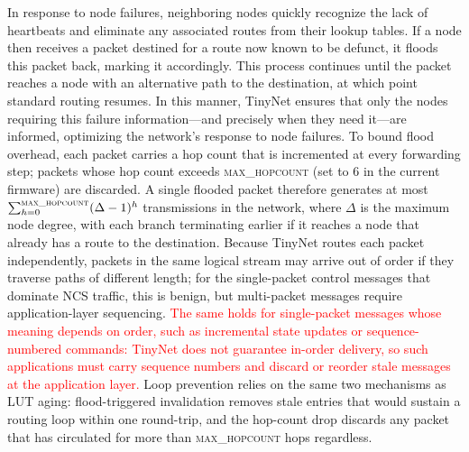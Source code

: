In response to node failures, neighboring nodes quickly recognize the lack of heartbeats and eliminate any associated routes from their lookup tables. If a node then receives a packet destined for a route now known to be defunct, it floods this packet back, marking it accordingly. This process continues until the packet reaches a node with an alternative path to the destination, at which point standard routing resumes. In this manner, TinyNet ensures that only the nodes requiring this failure information---and precisely when they need it---are informed, optimizing the network's response to node failures. To bound flood overhead, each packet carries a hop count that is incremented at every forwarding step; packets whose hop count exceeds \textsc{max\_hopcount} (set to 6 in the current firmware) are discarded. A single flooded packet therefore generates at most $\sum_{h=0}^{\textsc{max\_hopcount}}(\Delta-1)^{h}$ transmissions in the network, where $\Delta$ is the maximum node degree, with each branch terminating earlier if it reaches a node that already has a route to the destination. Because TinyNet routes each packet independently, packets in the same logical stream may arrive out of order if they traverse paths of different length; for the single-packet control messages that dominate NCS traffic, this is benign, but multi-packet messages require application-layer sequencing. \textcolor{red}{The same holds for single-packet messages whose meaning depends on order, such as incremental state updates or sequence-numbered commands: TinyNet does not guarantee in-order delivery, so such applications must carry sequence numbers and discard or reorder stale messages at the application layer.} Loop prevention relies on the same two mechanisms as LUT aging: flood-triggered invalidation removes stale entries that would sustain a routing loop within one round-trip, and the hop-count drop discards any packet that has circulated for more than \textsc{max\_hopcount} hops regardless.